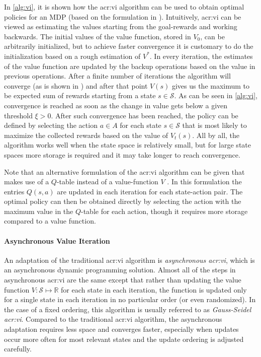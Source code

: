 In \autoref{alg:vi}, it is shown how the \acrshort{acr:vi} algorithm can be used to obtain optimal policies for an MDP (based on the formulation in \cite{poole2010artificial}).
Intuitively, \acrshort{acr:vi} can be viewed as estimating the values starting from the goal-rewards and working backwards.
The initial values of the value function, stored in $V_0$, can be arbitrarily initialized, but to achieve faster convergence it is customary to do the initialization based on a rough estimation of $V^*$.
In every iteration, the estimates of the value function are updated by the backup operations based on the value in previous operations.
After a finite number of iterations the algorithm will converge (as is shown in \cite{puterman2014markov}) and after that point $V(s)$ gives us the maximum to be expected sum of rewards starting from a state $s \in \mathcal{S}$.
As can be seen in \autoref{alg:vi}, convergence is reached as soon as the change in value gets below a given threshold $\xi > 0$.
After such convergence has been reached, the policy can be defined by selecting the action $a \in A$ for each state $s \in \mathcal{S}$ that is most likely to maximize the collected rewards based on the value of $V_t(s)$.
All by all, the algorithm works well when the state space is relatively small, but for large state spaces more storage is required and it may take longer to reach convergence.

Note that an alternative formulation of the \acrshort{acr:vi} algorithm can be given that makes use of a $Q$-table instead of a value-function $V$ \cite{singh2000convergence}.
In this formulation the entries $Q(s, a)$ are updated in each iteration for each state-action pair.
The optimal policy can then be obtained directly by selecting the action with the maximum value in the $Q$-table for each action, though it requires more storage compared to a value function.

\paragraph{Asynchronous Value Iteration}
\label{sec:gs-value-iteration}

An adaptation of the traditional \acrshort{acr:vi} algorithm is \textit{asynchronous \acrshort{acr:vi}}, which is an asynchronous dynamic programming solution.
Almost all of the steps in asynchronous \acrshort{acr:vi} are the same except that rather than updating the value function $V: \mathcal{S} \mapsto \mathbb{R}$ for each state in each iteration, the function is updated only for a single state in each iteration in no particular order (or even randomized).
In the case of a fixed ordering, this algorithm is usually referred to as \textit{Gauss-Seidel \acrshort{acr:vi}}.
Compared to the traditional \acrshort{acr:vi} algorithm, the asynchronous adaptation requires less space and converges faster, especially when updates occur more often for most relevant states and the update ordering is adjusted carefully.

